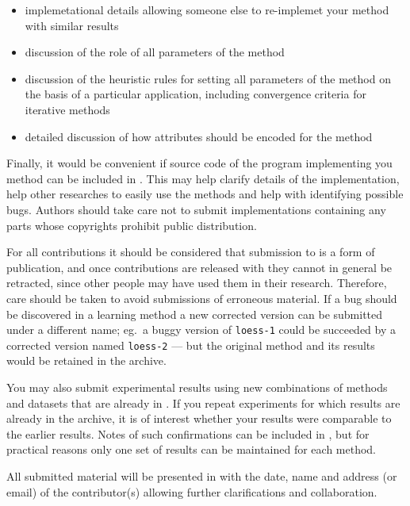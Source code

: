 \begin{itemize}
\item implemetational details allowing someone else to re-implemet your
method with similar results
\item discussion of the role of all parameters of the method
\item discussion of the heuristic rules for setting all parameters of the
method on the basis of a particular application, including convergence
criteria for iterative methods
\item detailed discussion of how attributes should be encoded for the
method
\end{itemize} 

Finally, it would be convenient if source code of the program
implementing you method can be included in \delve{}. This may help
clarify details of the implementation, help other researches to
easily use the methods and help with identifying possible
bugs. Authors should take care not to submit implementations
containing any parts whose copyrights prohibit public distribution.

For all contributions it should be considered that submission to
\delve{} is a form of publication, and once contributions are released
with \delve{} they cannot in general be retracted, since other people
may have used them in their research. Therefore, care should be taken
to avoid submissions of erroneous material. If a bug should be
discovered in a learning method a new corrected version can be
submitted under a different name; eg.~a buggy version of {\tt loess-1}
could be succeeded by a corrected version named {\tt loess-2} --- but
the original method and its results would be retained in the archive.

You may also submit experimental results using new combinations of
methods and datasets that are already in \delve{}. If you repeat
experiments for which results are already in the archive, it is of
interest whether your results were comparable to the earlier results.
Notes of such confirmations can be included in \delve{}, but for
practical reasons only one set of results can be maintained for each
method.

All submitted material will be presented in \delve{} with the date,
name and address (or email) of the contributor(s) allowing further
clarifications and collaboration.
